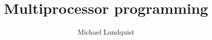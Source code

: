 \documentclass[titlepage]{article}
\author{Michael Lundquist}
\title{Multiprocessor programming}
\begin{document}
\maketitle



\begin{singlespace}


\newpage
\nocite{*}
\printbibliography
\end{singlespace}
\end{document}
